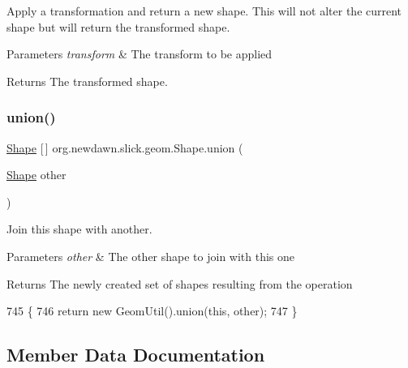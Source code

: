 Apply a transformation and return a new shape. This will not alter the current shape but will return the transformed shape.


\begin{DoxyParams}{Parameters}
{\em transform} & The transform to be applied \\
\hline
\end{DoxyParams}
\begin{DoxyReturn}{Returns}
The transformed shape. 
\end{DoxyReturn}
\mbox{\label{classorg_1_1newdawn_1_1slick_1_1geom_1_1_shape_a42ca84bd58011bc1d82d077d994bd9f1}} 
\subsubsection{\texorpdfstring{union()}{union()}}
{\footnotesize\ttfamily \mbox{\hyperlink{classorg_1_1newdawn_1_1slick_1_1geom_1_1_shape}{Shape}} \mbox{[}$\,$\mbox{]} org.\+newdawn.\+slick.\+geom.\+Shape.\+union (\begin{DoxyParamCaption}\item[{\mbox{\hyperlink{classorg_1_1newdawn_1_1slick_1_1geom_1_1_shape}{Shape}}}]{other }\end{DoxyParamCaption})\hspace{0.3cm}{\ttfamily [inline]}}

Join this shape with another.


\begin{DoxyParams}{Parameters}
{\em other} & The other shape to join with this one \\
\hline
\end{DoxyParams}
\begin{DoxyReturn}{Returns}
The newly created set of shapes resulting from the operation 
\end{DoxyReturn}

\begin{DoxyCode}
745                                       \{
746         \textcolor{keywordflow}{return} \textcolor{keyword}{new} GeomUtil().union(\textcolor{keyword}{this}, other);
747     \}
\end{DoxyCode}


\subsection{Member Data Documentation}
\mbox{\label{classorg_1_1newdawn_1_1slick_1_1geom_1_1_shape_ac89bf2b9c93a7294b49797fc7a054c11}} 

